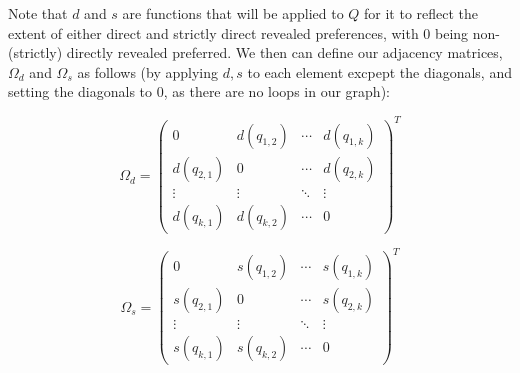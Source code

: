 \documentclass{article} %
\begin{document}
Note that $d$ and $s$ are functions that will be applied to $Q$ for it to reflect the extent of either direct and strictly direct revealed preferences, with 0 being non-(strictly) directly revealed preferred. We then can define our adjacency matrices, $\Omega_d$ and $\Omega_s$ as follows (by applying $d,s$ to each element excpept the diagonals, and setting the diagonals to 0, as there are no loops in our graph):

\[
\Omega_d =
  \begin{pmatrix}
  0 & d(q_{1,2}) & \cdots & d(q_{1,k}) \\
    d(q_{2,1}) & 0 & \cdots & d(q_{2,k}) \\
    \vdots & \vdots & \ddots & \vdots \\
    d(q_{k,1}) & d(q_{k,2}) & \cdots & 0
  \end{pmatrix}^T
\]

\[
\Omega_s =
  \begin{pmatrix}
  0 & s(q_{1,2}) & \cdots & s(q_{1,k}) \\
    s(q_{2,1}) & 0 & \cdots & s(q_{2,k}) \\
    \vdots & \vdots & \ddots & \vdots \\
    s(q_{k,1}) & s(q_{k,2}) & \cdots & 0
  \end{pmatrix} ^T
\]
\end{document}
